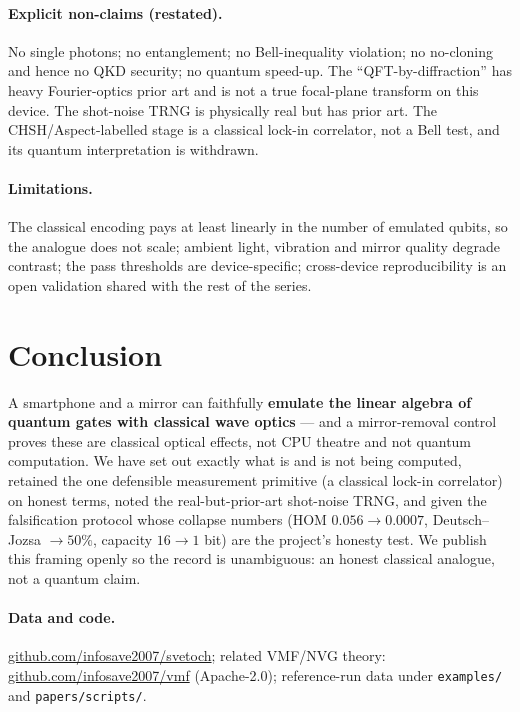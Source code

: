 \documentclass[11pt]{article}
\begin{document}
\paragraph{Explicit non-claims (restated).} No single photons; no entanglement; no
Bell-inequality violation; no no-cloning and hence no QKD security; no quantum speed-up. The
``QFT-by-diffraction'' has heavy Fourier-optics prior art and is not a true focal-plane transform
on this device. The shot-noise TRNG is physically real but has prior art. The CHSH/Aspect-labelled
stage is a classical lock-in correlator, not a Bell test, and its quantum interpretation is
withdrawn.

\paragraph{Limitations.} The classical encoding pays at least linearly in the number of emulated
qubits, so the analogue does not scale; ambient light, vibration and mirror quality degrade
contrast; the pass thresholds are device-specific; cross-device reproducibility is an open
validation shared with the rest of the series.

\section{Conclusion}
A smartphone and a mirror can faithfully \textbf{emulate the linear algebra of quantum gates with
classical wave optics} --- and a mirror-removal control proves these are classical optical effects, not CPU
theatre and not quantum computation. We have set out exactly what is and is not being computed,
retained the one defensible measurement primitive (a classical lock-in correlator) on honest
terms, noted the real-but-prior-art shot-noise TRNG, and given the falsification protocol whose
collapse numbers (HOM $0.056\to0.0007$, Deutsch--Jozsa $\to50\%$, capacity $16\to1$ bit) are the
project's honesty test. We publish this framing openly so the record is unambiguous: an honest
classical analogue, not a quantum claim.

\paragraph{Data and code.} \href{https://github.com/infosave2007/svetoch}{github.com/infosave2007/svetoch}; related VMF/NVG theory: \href{https://github.com/infosave2007/vmf}{github.com/infosave2007/vmf}
(Apache-2.0); reference-run data under \texttt{examples/} and \texttt{papers/scripts/}.
\end{document}
